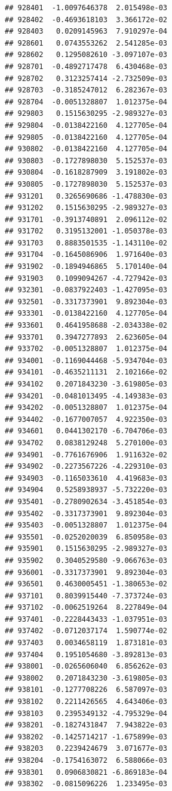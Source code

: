 \documentclass[ignorenonframetext,]{beamer}
\begin{document}
\begin{frame}[fragile]
\begin{verbatim}
## 928401  -1.0097646378  2.015498e-03
## 928402  -0.4693618103  3.366172e-02
## 928403   0.0209145963  7.910297e-04
## 928601   0.0743553262  2.541285e-03
## 928602   0.1295082610 -3.097107e-03
## 928701  -0.4892717478  6.430468e-03
## 928702   0.3123257414 -2.732509e-03
## 928703  -0.3185247012  6.282367e-03
## 928704  -0.0051328807  1.012375e-04
## 929803   0.1515630295 -2.989327e-03
## 929804  -0.0138422160  4.127705e-04
## 929805  -0.0138422160  4.127705e-04
## 930802  -0.0138422160  4.127705e-04
## 930803  -0.1727898030  5.152537e-03
## 930804  -0.1618287909  3.191802e-03
## 930805  -0.1727898030  5.152537e-03
## 931201   0.3265690686 -1.478830e-03
## 931202   0.1515630295 -2.989327e-03
## 931701  -0.3913740891  2.096112e-02
## 931702   0.3195132001 -1.050378e-03
## 931703   0.8883501535 -1.143110e-02
## 931704  -0.1645086906  1.971640e-03
## 931902  -0.1894946865  5.170140e-04
## 931903   0.1099094267 -4.727942e-03
## 932301  -0.0837922403 -1.427095e-03
## 932501  -0.3317373901  9.892304e-03
## 933301  -0.0138422160  4.127705e-04
## 933601   0.4641958688 -2.034338e-02
## 933701   0.3947277893  2.623605e-04
## 933702  -0.0051328807  1.012375e-04
## 934001  -0.1169044468 -5.934704e-03
## 934101  -0.4635211131  2.102166e-02
## 934102   0.2071843230 -3.619805e-03
## 934201  -0.0481013495 -4.149383e-03
## 934202  -0.0051328807  1.012375e-04
## 934402  -0.1677007057  4.922350e-03
## 934601   0.0441302170 -6.704706e-03
## 934702   0.0838129248  5.270100e-03
## 934901  -0.7761676906  1.911632e-02
## 934902  -0.2273567226 -4.229310e-03
## 934903  -0.1165033610  4.419683e-03
## 934904   0.5258938937 -5.732220e-03
## 935401  -0.2780902634 -3.451854e-03
## 935402  -0.3317373901  9.892304e-03
## 935403  -0.0051328807  1.012375e-04
## 935501  -0.0252020039  6.850958e-03
## 935901   0.1515630295 -2.989327e-03
## 935902   0.3040529580 -9.066763e-03
## 936001  -0.3317373901  9.892304e-03
## 936501   0.4630005451 -1.380653e-02
## 937101   0.8039915440 -7.373724e-03
## 937102  -0.0062519264  8.227849e-04
## 937401  -0.2228443433 -1.037951e-03
## 937402  -0.0712037174  1.590774e-02
## 937403   0.0034658119  1.873181e-03
## 937404   0.1951054680 -3.892813e-03
## 938001  -0.0265606040  6.856262e-03
## 938002   0.2071843230 -3.619805e-03
## 938101  -0.1277708226  6.587097e-03
## 938102   0.2211426565  4.643406e-03
## 938103   0.2395349132 -4.795329e-04
## 938201  -0.1827431847  7.943822e-03
## 938202  -0.1425714217 -1.675899e-03
## 938203   0.2239424679  3.071677e-03
## 938204  -0.1754163072  6.588066e-03
## 938301   0.0906830821 -6.869183e-04
## 938302  -0.0815096226  1.233495e-03

\end{verbatim}
\end{frame}
\end{document}
